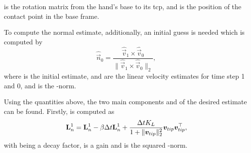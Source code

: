  is the rotation matrix from the hand's base to its \gls{tcp}, and  is the position of the contact point in the base frame. \medskip

To compute the normal estimate, additionally, an initial guess is needed which is computed by
%
\begin{equation} \label{eq:def-n-init}
	\hat{\vec{n}}_{0} = \frac{\hat{\vec{v}}_{1} \times \hat{\vec{v}}_{0}}{\| \hat{\vec{v}}_{1} \times \hat{\vec{v}}_{0} \|_2},
\end{equation}
where  is the initial estimate,  and  are the linear velocity estimates for time step \num{1} and \num{0}, and  is the -norm. \medskip

Using the quantities above, the two main components  and  of the desired estimate  can be found. Firstly,  is computed as
%
\begin{equation} \label{eq:def-L-n-1}
	\bm{\mathrm{L}}_n^1 = \bm{\mathrm{L}}_n^1 - \beta \Delta t \bm{\mathrm{L}}_n^1 + \frac{\Delta t K_L}{1+\|\bm{v}_{tip}\|_2^2} \bm{v}_{tip} \bm{v}_{tip}^\top,
\end{equation}
with \mvar{\beta\inR{}} being a decay factor,  is a gain and  is the squared -norm. \medskip

